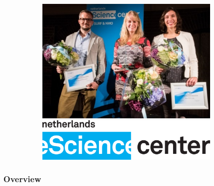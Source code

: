 \documentclass[8pt,xcolor=table,aspectratio=169]{beamer}
\begin{document}
\begin{frame}
\begin{figure}
\begin{subfigure}{0.6\textwidth}
\end{subfigure}
\begin{subfigure}{0.3\textwidth}
 \centering
 \vspace{-4em}
 \includegraphics[width=\textwidth]{esther_tadpoleshare}
 \includegraphics[width=\textwidth]{netherlands_escience}
\end{subfigure}
\end{figure}

\end{frame}


\begin{frame}
\frametitle{Overview}


\begin{figure}
\centering

{
\ovEBM
\ovVWDPM

\ovDKT
\ovTadpole}

\ovPainter



\end{figure}
\end{frame}
\end{document}

